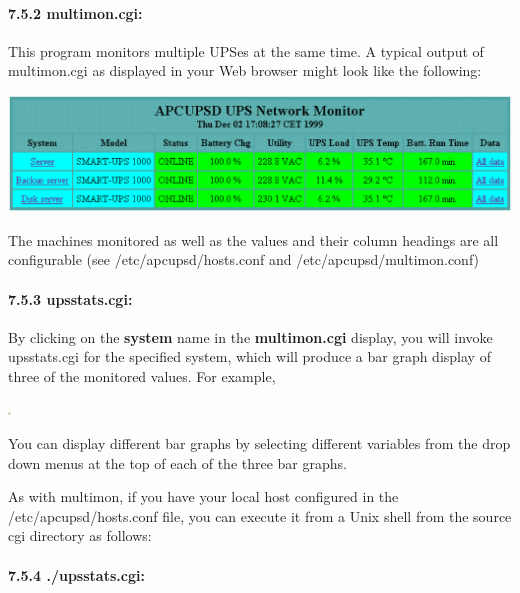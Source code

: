 {{{{{{{{\label{multimon_005fcgi}

\paragraph*{7.5.2 multimon.cgi:}

\label{index-multimon-126}
\label{index-CGI_002c-multimon-127}
This program monitors multiple UPSes at the same time. A typical output of
multimon.cgi as displayed in your Web browser might look like the following:  

\includegraphics{./multimon.eps}  

The machines monitored as well as the values and their column headings are all
configurable (see /etc/apcupsd/hosts.conf and /etc/apcupsd/multimon.conf) 

\label{upsstats_005fcgi}

\paragraph*{7.5.3 upsstats.cgi:}

\label{index-upsstats-128}
\label{index-CGI_002c-upsstats-129}
By clicking on the {\bf system} name in the {\bf multimon.cgi} display, you
will invoke upsstats.cgi for the specified system, which will produce a bar
graph display of three of the monitored values. For example,  

\includegraphics{./status.eps}  

You can display different bar graphs by selecting different variables from the
drop down menus at the top of each of the three bar graphs.  

As with multimon, if you have your local host configured in the
/etc/apcupsd/hosts.conf file, you can execute it from a Unix shell from the
source cgi directory as follows: 

\label{_005f_002fupsstats_005fcgi}

\paragraph*{7.5.4 ./upsstats.cgi:}

}}}}}}}}

